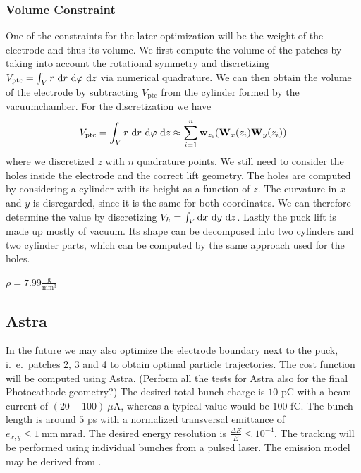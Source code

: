 \subsubsection{Volume Constraint}
One of the constraints for the later optimization will be the weight of the electrode and thus its volume.
We first compute the volume of the patches by taking into account the rotational symmetry and discretizing $V_{\mathrm{ptc}} = \int_V r\ \mathrm{d} r\ \mathrm{d} \varphi\ \mathrm{d} z$ via numerical quadrature. We can then obtain the volume of the electrode by subtracting $V_{\mathrm{ptc}}$ from the cylinder formed by the vacuumchamber.
For the discretization we have
\begin{align}
   V_{\mathrm{ptc}} = \int_V r\ \mathrm{d} r\ \mathrm{d} \varphi\ \mathrm{d} z \approx \sum_{i=1}^n \mathbf{w}_{z_i} (\mathbf{W}_x(z_i) \mathbf{W}_y(z_i))
\end{align}
where we discretized $z$ with $n$ quadrature points.
We still need to consider the holes inside the electrode and the correct lift geometry. The holes are computed by considering a cylinder with its height as a function of $z$. The curvature in $x$ and $y$ is disregarded, since it is the same for both coordinates. We can therefore determine the value by discretizing $V_{h} = \int_V \mathrm{d} x\ \mathrm{d} y\ \mathrm{d} z$.
Lastly the puck lift is made up mostly of vacuum. Its shape can be decomposed into two cylinders and two cylinder parts, which can be computed by the same approach used for the holes.

$\rho = 7.99 \frac{\mathrm{g}}{\mathrm{mm}^3}$

\subsection{Astra}
In the future we may also optimize the electrode boundary next to the puck, i.~e.~patches 2, 3 and 4 to obtain optimal particle trajectories. The cost function will be computed using Astra. (Perform all the tests for Astra also for the final Photocathode geometry?)
The desired total bunch charge is $10$ pC with a beam current of $(20-100)\ \mu\mathrm{A}$, whereas a typical value would be $100$ fC. The bunch length is around $5$ ps with a normalized transversal emittance of $e_{x,y} \leq 1\ \mathrm{mm\ mrad}$. The desired energy resolution is $\frac{\Delta E}{E} \leq 10^{-4}$.
The tracking will be performed using individual bunches from a pulsed laser. The emission model may be derived from \cite{wagner}.
